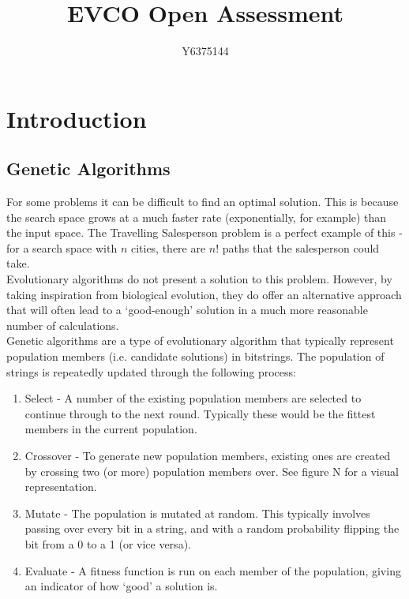 \documentclass[]{report}
\title{EVCO Open Assessment}
\author{Y6375144}
\begin{document}
\maketitle

\chapter{Introduction}

\section{Genetic Algorithms}

For some problems it can be difficult to find an optimal solution. This is because the search space grows at a much faster rate (exponentially, for example) than the input space. The Travelling Salesperson problem is a perfect example of this - for a search space with $n$ cities, there are $n!$ paths that the salesperson could take.\\

Evolutionary algorithms do not present a solution to this problem. However, by taking inspiration from biological evolution, they do offer an alternative approach that will often lead to a `good-enough' solution in a much more reasonable number of calculations. \\

Genetic algorithms are a type of evolutionary algorithm that typically represent population members (i.e. candidate solutions) in bitstrings. The population of strings is repeatedly updated through the following process:

\begin{enumerate}
	\item Select - A number of the existing population members are selected to continue through to the next round. Typically these would be the fittest members in the current population.
	\item Crossover - To generate new population members, existing ones are created by crossing two (or more) population members over. See figure N for a visual representation.
	\item Mutate - The population is mutated at random. This typically involves passing over every bit in a string, and with a random probability flipping the bit from a 0 to a 1 (or vice versa).
	\item Evaluate - A fitness function is run on each member of the population, giving an indicator of how `good' a solution is.
\end{enumerate}
\end{document}

